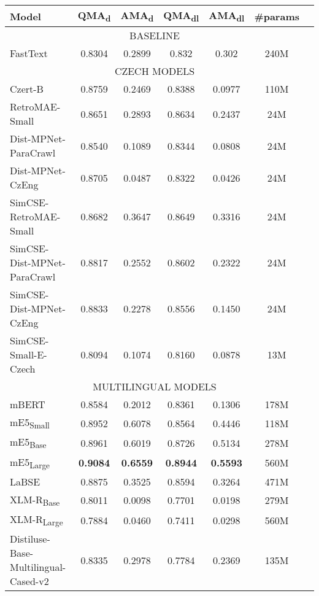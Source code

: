 \begin{table*}[ht!]
    \centering
    \begin{tabular}{lcccccc}
      \toprule
      \textbf{Model} & \textbf{QMA}\textsubscript{d} & \textbf{AMA}\textsubscript{d} & \textbf{QMA}\textsubscript{dl} & \textbf{AMA}\textsubscript{dl} & \textbf{\#params} \\
      \midrule
      \multicolumn{6}{c}{BASELINE} \\
      \hline
      FastText & 0.8304 & 0.2899 & 0.832 & 0.302 & 240M \\
      \hline
      \multicolumn{6}{c}{CZECH MODELS} \\
      \hline
      Czert-B & 0.8759 & 0.2469 & 0.8388 & 0.0977 & 110M \\
      RetroMAE-Small & 0.8651 & 0.2893 & 0.8634 & 0.2437 & 24M \\
      Dist-MPNet-ParaCrawl & 0.8540 & 0.1089 & 0.8344 & 0.0808 & 24M \\
      Dist-MPNet-CzEng & 0.8705 & 0.0487 & 0.8322 & 0.0426 & 24M \\
      SimCSE-RetroMAE-Small & 0.8682 & 0.3647 & 0.8649 & 0.3316 & 24M \\
      SimCSE-Dist-MPNet-ParaCrawl & 0.8817 & 0.2552 & 0.8602 & 0.2322 & 24M \\
      SimCSE-Dist-MPNet-CzEng & 0.8833 & 0.2278 & 0.8556 & 0.1450 & 24M \\
      SimCSE-Small-E-Czech & 0.8094 & 0.1074 & 0.8160 & 0.0878 & 13M \\
      \hline
      \multicolumn{6}{c}{MULTILINGUAL MODELS} \\
      \hline
      mBERT & 0.8584 & 0.2012 & 0.8361 & 0.1306 & 178M \\
      mE5\textsubscript{Small} & 0.8952 & 0.6078 & 0.8564 & 0.4446 & 118M \\
      mE5\textsubscript{Base} & 0.8961 & 0.6019 & 0.8726 & 0.5134 & 278M \\
      mE5\textsubscript{Large} & \textbf{0.9084} & \textbf{0.6559} & \textbf{0.8944} & \textbf{0.5593} & 560M \\
      LaBSE & 0.8875 & 0.3525 & 0.8594 & 0.3264 & 471M \\
      XLM-R\textsubscript{Base} & 0.8011 & 0.0098 & 0.7701 & 0.0198 & 279M \\
      XLM-R\textsubscript{Large} & 0.7884 & 0.0460 & 0.7411 & 0.0298 & 560M \\
      Distiluse-Base-Multilingual-Cased-v2 & 0.8335 & 0.2978 & 0.7784 & 0.2369 & 135M \\

\end{tabular}
\end{table*}
